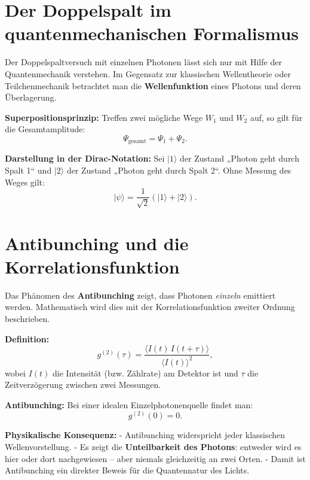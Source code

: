 \section{Der Doppelspalt im quantenmechanischen Formalismus}
\label{anhangA:doppelspalt}

Der Doppelspaltversuch mit einzelnen Photonen lässt sich nur mit Hilfe der Quantenmechanik verstehen. 
Im Gegensatz zur klassischen Wellentheorie oder Teilchenmechanik betrachtet man die \textbf{Wellenfunktion} 
eines Photons und deren Überlagerung.

\textbf{Superpositionsprinzip:}  
Treffen zwei mögliche Wege \( W_1 \) und \( W_2 \) auf, so gilt für die Gesamtamplitude:
\[
\Psi_{\text{gesamt}} = \Psi_{1} + \Psi_{2}.
\]

\textbf{Darstellung in der Dirac-Notation:}  
Sei \(|1\rangle\) der Zustand „Photon geht durch Spalt 1“ und \(|2\rangle\) der Zustand „Photon geht durch Spalt 2“.  
Ohne Messung des Weges gilt:
\[
|\psi\rangle = \frac{1}{\sqrt{2}} \left( |1\rangle + |2\rangle \right).
\]

\section{Antibunching und die Korrelationsfunktion}
\label{anhangA:antibunching}

Das Phänomen des \textbf{Antibunching} zeigt, dass Photonen \emph{einzeln} emittiert werden. 
Mathematisch wird dies mit der Korrelationsfunktion zweiter Ordnung beschrieben.

\textbf{Definition:}
\[
g^{(2)}(\tau) = \frac{\langle I(t) \, I(t+\tau) \rangle}{\langle I(t) \rangle^2},
\]
wobei \( I(t) \) die Intensität (bzw. Zählrate) am Detektor ist und \(\tau\) die Zeitverzögerung zwischen zwei Messungen.

\textbf{Antibunching:}
Bei einer idealen Einzelphotonenquelle findet man:
\[
g^{(2)}(0) = 0.
\]

\textbf{Physikalische Konsequenz:}
- Antibunching widerspricht jeder klassischen Wellenvorstellung.  
- Es zeigt die \textbf{Unteilbarkeit des Photons}: entweder wird es hier oder dort nachgewiesen – aber niemals gleichzeitig an zwei Orten.  
- Damit ist Antibunching ein direkter Beweis für die Quantennatur des Lichts.

